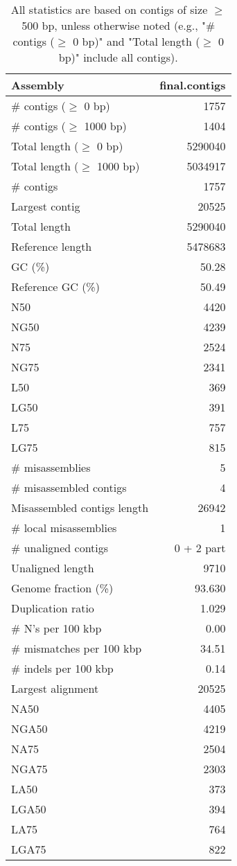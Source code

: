 \documentclass[12pt,a4paper]{article}
\begin{document}
\begin{table}[ht]
\begin{center}
\caption{All statistics are based on contigs of size $\geq$ 500 bp, unless otherwise noted (e.g., "\# contigs ($\geq$ 0 bp)" and "Total length ($\geq$ 0 bp)" include all contigs).}
\begin{tabular}{|l*{1}{|r}|}
\hline
Assembly & final.contigs \\ \hline
\# contigs ($\geq$ 0 bp) & 1757 \\ \hline
\# contigs ($\geq$ 1000 bp) & 1404 \\ \hline
Total length ($\geq$ 0 bp) & 5290040 \\ \hline
Total length ($\geq$ 1000 bp) & 5034917 \\ \hline
\# contigs & 1757 \\ \hline
Largest contig & 20525 \\ \hline
Total length & 5290040 \\ \hline
Reference length & 5478683 \\ \hline
GC (\%) & 50.28 \\ \hline
Reference GC (\%) & 50.49 \\ \hline
N50 & 4420 \\ \hline
NG50 & 4239 \\ \hline
N75 & 2524 \\ \hline
NG75 & 2341 \\ \hline
L50 & 369 \\ \hline
LG50 & 391 \\ \hline
L75 & 757 \\ \hline
LG75 & 815 \\ \hline
\# misassemblies & 5 \\ \hline
\# misassembled contigs & 4 \\ \hline
Misassembled contigs length & 26942 \\ \hline
\# local misassemblies & 1 \\ \hline
\# unaligned contigs & 0 + 2 part \\ \hline
Unaligned length & 9710 \\ \hline
Genome fraction (\%) & 93.630 \\ \hline
Duplication ratio & 1.029 \\ \hline
\# N's per 100 kbp & 0.00 \\ \hline
\# mismatches per 100 kbp & 34.51 \\ \hline
\# indels per 100 kbp & 0.14 \\ \hline
Largest alignment & 20525 \\ \hline
NA50 & 4405 \\ \hline
NGA50 & 4219 \\ \hline
NA75 & 2504 \\ \hline
NGA75 & 2303 \\ \hline
LA50 & 373 \\ \hline
LGA50 & 394 \\ \hline
LA75 & 764 \\ \hline
LGA75 & 822 \\ \hline
\end{tabular}
\end{center}
\end{table}
\end{document}
